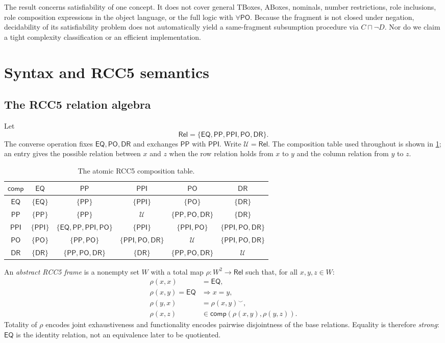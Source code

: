 \documentclass[11pt]{article}
\theoremstyle{plain}
\theoremstyle{definition}
\theoremstyle{remark}
\newcommand{\Rel}{\ensuremath{\mathsf{Rel}}}
\newcommand{\EQ}{\ensuremath{\mathsf{EQ}}}
\newcommand{\PP}{\ensuremath{\mathsf{PP}}}
\newcommand{\PPI}{\ensuremath{\mathsf{PPI}}}
\newcommand{\PO}{\ensuremath{\mathsf{PO}}}
\newcommand{\DR}{\ensuremath{\mathsf{DR}}}
\newcommand{\comp}{\ensuremath{\mathsf{comp}}}
\begin{document}
The result concerns satisfiability of one concept.  It does not cover general
TBoxes, ABoxes, nominals, number restrictions, role inclusions, role
composition expressions in the object language, or the full logic with
$\forall\PO$.  Because the fragment is not closed under negation, decidability
of its satisfiability problem does not automatically yield a same-fragment
subsumption procedure via $C\sqcap\neg D$.  Nor do we claim a tight complexity
classification or an efficient implementation.

\section{Syntax and RCC5 semantics}
\label{sec:semantics}

\subsection{The RCC5 relation algebra}

Let
\[
  \Rel=\{\EQ,\PP,\PPI,\PO,\DR\}.
\]
The converse operation fixes $\EQ,\PO,\DR$ and exchanges $\PP$ with $\PPI$.
Write $\mathcal U=\Rel$.  The composition table used throughout is shown in
\cref{tab:composition}; an entry gives the possible relation between $x$ and
$z$ when the row relation holds from $x$ to $y$ and the column relation from
$y$ to $z$.

\begin{table}[htbp]
\centering
\small
\renewcommand{\arraystretch}{1.18}
\begin{tabular}{c*{5}{c}}
\toprule
$\comp$ & \EQ & \PP & \PPI & \PO & \DR\\
\midrule
\EQ  & $\{\EQ\}$ & $\{\PP\}$ & $\{\PPI\}$ & $\{\PO\}$ & $\{\DR\}$\\
\PP  & $\{\PP\}$ & $\{\PP\}$ & $\mathcal U$ & $\{\PP,\PO,\DR\}$ & $\{\DR\}$\\
\PPI & $\{\PPI\}$ & $\{\EQ,\PP,\PPI,\PO\}$ & $\{\PPI\}$ & $\{\PPI,\PO\}$ & $\{\PPI,\PO,\DR\}$\\
\PO  & $\{\PO\}$ & $\{\PP,\PO\}$ & $\{\PPI,\PO,\DR\}$ & $\mathcal U$ & $\{\PPI,\PO,\DR\}$\\
\DR  & $\{\DR\}$ & $\{\PP,\PO,\DR\}$ & $\{\DR\}$ & $\{\PP,\PO,\DR\}$ & $\mathcal U$\\
\bottomrule
\end{tabular}
\caption{The atomic RCC5 composition table.}
\label{tab:composition}
\end{table}

An \emph{abstract RCC5 frame} is a nonempty set $W$ with a total map
$\rho:W^2\to\Rel$ such that, for all $x,y,z\in W$:
\begin{align*}
  \rho(x,x)&=\EQ,\\
  \rho(x,y)=\EQ&\Longrightarrow x=y,\\
  \rho(y,x)&=\rho(x,y)^{\smile},\\
  \rho(x,z)&\in\comp(\rho(x,y),\rho(y,z)).
\end{align*}
Totality of $\rho$ encodes joint exhaustiveness and functionality encodes
pairwise disjointness of the base relations.  Equality is therefore
\emph{strong}: $\EQ$ is the identity relation, not an equivalence later to be
quotiented.
\end{document}
